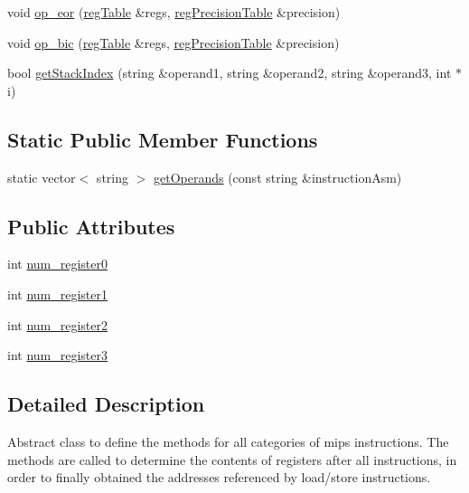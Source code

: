 \begin{DoxyCompactItemize}
\item 
void \hyperlink{classDAAInstruction_a71983578f511b37f053de641a06f8ae4}{op\+\_\+eor} (\hyperlink{DAAInstruction_8h_af0fae93a861de9cf37988d5673cac523}{reg\+Table} \&regs, \hyperlink{DAAInstruction_8h_a0e8cae02815a5f8adc750122d790b455}{reg\+Precision\+Table} \&precision)
\item 
void \hyperlink{classDAAInstruction_a3ae2804abee589621799869c38895cf7}{op\+\_\+bic} (\hyperlink{DAAInstruction_8h_af0fae93a861de9cf37988d5673cac523}{reg\+Table} \&regs, \hyperlink{DAAInstruction_8h_a0e8cae02815a5f8adc750122d790b455}{reg\+Precision\+Table} \&precision)
\item 
bool \hyperlink{classDAAInstruction_a41c1397757508bba967c2fa0baf2174e}{get\+Stack\+Index} (string \&operand1, string \&operand2, string \&operand3, int $\ast$i)
\end{DoxyCompactItemize}
\subsection*{Static Public Member Functions}
\begin{DoxyCompactItemize}
\item 
static vector$<$ string $>$ \hyperlink{classDAAInstruction_a9a78da79cf0a261829690f0eb90af6cf}{get\+Operands} (const string \&instruction\+Asm)
\end{DoxyCompactItemize}
\subsection*{Public Attributes}
\begin{DoxyCompactItemize}
\item 
int \hyperlink{classDAAInstruction_ac888c18ef9af44f4f706f890b4fc9c76}{num\+\_\+register0}
\item 
int \hyperlink{classDAAInstruction_a4e13622e1d95fae89159a5e01a6407e0}{num\+\_\+register1}
\item 
int \hyperlink{classDAAInstruction_a5af649a9a34f6b1c97a230673de15870}{num\+\_\+register2}
\item 
int \hyperlink{classDAAInstruction_af5fc536f45cd3db86fe4802a52fbf773}{num\+\_\+register3}
\end{DoxyCompactItemize}


\subsection{Detailed Description}
Abstract class to define the methods for all categories of mips instructions. The methods are called to determine the contents of registers after all instructions, in order to finally obtained the addresses referenced by load/store instructions. 

